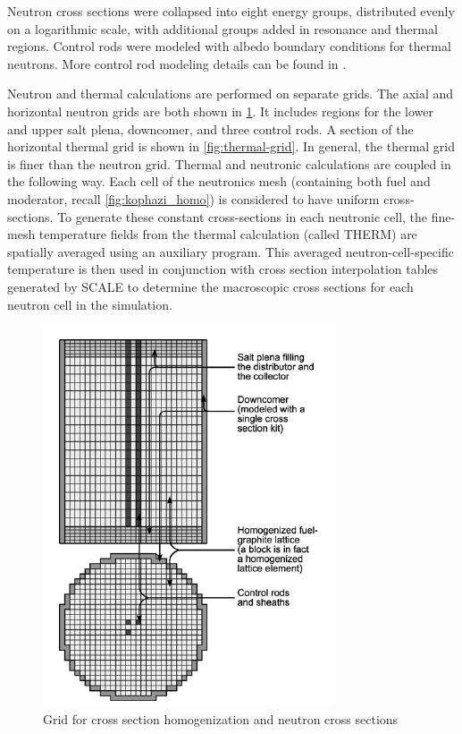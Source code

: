 \documentclass{article}
\begin{document}
Neutron cross sections were collapsed into eight energy groups, distributed
evenly on a logarithmic scale, with additional groups added in resonance and
thermal regions. Control rods were modeled with albedo boundary conditions for
thermal neutrons. More control rod modeling details can be found in
\cite{kophazi_development_2009}.

Neutron and thermal calculations are performed on separate grids. The axial and
horizontal neutron grids are both shown in \cref{fig:neutron-grid}. It includes
regions for the lower and upper salt plena, downcomer, and three control rods. A
section of the horizontal thermal grid is shown in \cref{fig:thermal-grid}. In
general, the thermal grid is finer than the neutron grid. Thermal and neutronic
calculations are coupled in the following way. Each cell of the neutronics mesh
(containing both fuel and moderator, recall \cref{fig:kophazi_homo}) is
considered to have uniform cross-sections. To generate these constant
cross-sections in each neutronic cell, the fine-mesh temperature fields from
the thermal calculation (called THERM) are spatially averaged using an auxiliary
program. This averaged neutron-cell-specific temperature is then used in
conjunction with cross section interpolation tables generated by SCALE to
determine the macroscopic cross sections for each neutron cell in the
simulation.

\begin{figure}[htpb]
  \centering
  \includegraphics[max height=.5\textheight,max width=\textwidth,keepaspectratio]{3d-neutron-grid.png}
  \caption{Grid for cross section homogenization and neutron cross sections
    \cite{kophazi_development_2009}}
  \label{fig:neutron-grid}
\end{figure}
\end{document}
